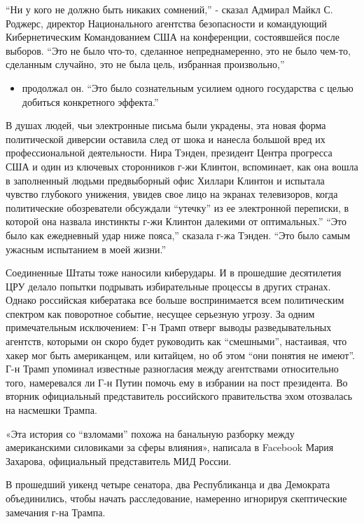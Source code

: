 ``Ни у кого не должно быть никаких сомнений,'' - сказал Адмирал Майкл С.
Роджерс, директор Национального агентства безопасности и командующий
Кибернетическим Командованием США на конференции, состоявшейся после
выборов. ``Это не было что-то, сделанное непреднамеренно, это не было
чем-то, сделанным случайно, это не была цель, избранная произвольно,''

\begin{itemize}
\tightlist
\item
  продолжал он. ``Это было сознательным усилием одного государства с
  целью добиться конкретного эффекта.''
\end{itemize}

В душах людей, чьи электронные письма были украдены, эта новая форма
политической диверсии оставила след от шока и нанесла большой вред их
профессиональной деятельности. Нира Тэнден, президент Центра прогресса
США и один из ключевых сторонников г-жи Клинтон, вспоминает, как она
вошла в заполненный людьми предвыборный офис Хиллари Клинтон и испытала
чувство глубокого унижения, увидев свое лицо на экранах телевизоров,
когда политические обозреватели обсуждали ``утечку'' из ее электронной
переписки, в которой она назвала инстинкты г-жи Клинтон далекими от
оптимальных.'' ``Это было как ежедневный удар ниже пояса,'' сказала г-жа
Тэнден. ``Это было самым ужасным испытанием в моей жизни.''

Соединенные Штаты тоже наносили киберудары. И в прошедшие десятилетия
ЦРУ делало попытки подрывать избирательные процессы в других странах.
Однако российская кибератака все больше воспринимается всем политическим
спектром как поворотное событие, несущее серьезную угрозу. За одним
примечательным исключением: Г-н Трамп отверг выводы разведывательных
агентств, которыми он скоро будет руководить как ``смешными'',
настаивая, что хакер мог быть американцем, или китайцем, но об этом
``они понятия не имеют''. Г-н Трамп упоминал известные разногласия между
агентствами относительно того, намеревался ли Г-н Путин помочь ему в
избрании на пост президента. Во вторник официальный представитель
российского правительства эхом отозвалась на насмешки Трампа.

«Эта история со ``взломами'' похожа на банальную разборку между
американскими силовиками за сферы влияния», написала в Facebook Мария
Захарова, официальный представитель МИД России.

В прошедший уикенд четыре сенатора, два Республиканца и два Демократа
объединились, чтобы начать расследование, намеренно игнорируя
скептические замечания г-на Трампа.

